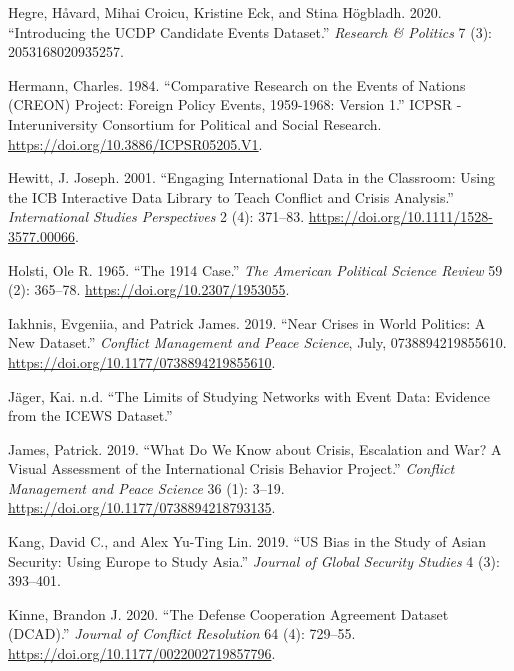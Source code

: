 \documentclass{article}
\newlength{\cslhangindent}
\newlength{\cslentryspacingunit} %
\newenvironment{CSLReferences}[2] %
 {%
  \setlength{\parindent}{0pt}
  \ifodd #1
  \let\oldpar\par
  \def\par{\hangindent=\cslhangindent\oldpar}
  \fi
  \setlength{\parskip}{#2\cslentryspacingunit}
 }%
 {}
\begin{document}
\begin{CSLReferences}{1}{0}
\leavevmode{}%
Hegre, Håvard, Mihai Croicu, Kristine Eck, and Stina Högbladh. 2020.
{``Introducing the {UCDP Candidate Events Dataset}.''} \emph{Research \&
Politics} 7 (3): 2053168020935257.

\leavevmode{}%
Hermann, Charles. 1984. {``Comparative {Research} on the {Events} of
{Nations} ({CREON}) {Project}: {Foreign Policy Events}, 1959-1968:
{Version} 1.''} {ICPSR - Interuniversity Consortium for Political and
Social Research}. \url{https://doi.org/10.3886/ICPSR05205.V1}.

\leavevmode{}%
Hewitt, J. Joseph. 2001. {``Engaging {International Data} in the
{Classroom}: {Using} the {ICB Interactive Data Library} to {Teach
Conflict} and {Crisis Analysis}.''} \emph{International Studies
Perspectives} 2 (4): 371--83.
\url{https://doi.org/10.1111/1528-3577.00066}.

\leavevmode{}%
Holsti, Ole R. 1965. {``The 1914 {Case}.''} \emph{The American Political
Science Review} 59 (2): 365--78. \url{https://doi.org/10.2307/1953055}.

\leavevmode{}%
Iakhnis, Evgeniia, and Patrick James. 2019. {``Near Crises in World
Politics: {A} New Dataset.''} \emph{Conflict Management and Peace
Science}, July, 0738894219855610.
\url{https://doi.org/10.1177/0738894219855610}.

\leavevmode{}%
Jäger, Kai. n.d. {``The {Limits} of {Studying Networks} with {Event
Data}: {Evidence} from the {ICEWS Dataset}.''}

\leavevmode{}%
James, Patrick. 2019. {``What Do We Know about Crisis, Escalation and
War? {A} Visual Assessment of the {International Crisis Behavior
Project}.''} \emph{Conflict Management and Peace Science} 36 (1): 3--19.
\url{https://doi.org/10.1177/0738894218793135}.

\leavevmode{}%
Kang, David C., and Alex Yu-Ting Lin. 2019. {``{US} Bias in the Study of
{Asian} Security: {Using Europe} to Study {Asia}.''} \emph{Journal of
Global Security Studies} 4 (3): 393--401.

\leavevmode{}%
Kinne, Brandon J. 2020. {``The {Defense Cooperation Agreement Dataset}
({DCAD}).''} \emph{Journal of Conflict Resolution} 64 (4): 729--55.
\url{https://doi.org/10.1177/0022002719857796}.


\end{CSLReferences}
\end{document}
